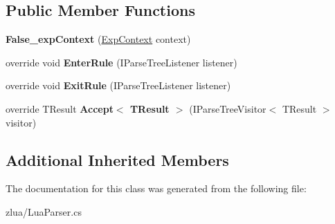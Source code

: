 \subsection*{Public Member Functions}
\begin{DoxyCompactItemize}
\item 
\mbox{\label{classzlua_1_1_lua_parser_1_1_false__exp_context_a066129971f105fe49aa323a2e0ed29c5}} 
{\bfseries False\+\_\+exp\+Context} (\mbox{\hyperlink{classzlua_1_1_lua_parser_1_1_exp_context}{Exp\+Context}} context)
\item 
\mbox{\label{classzlua_1_1_lua_parser_1_1_false__exp_context_ae0f16242c9c8b34a0d7a8915640aa41b}} 
override void {\bfseries Enter\+Rule} (I\+Parse\+Tree\+Listener listener)
\item 
\mbox{\label{classzlua_1_1_lua_parser_1_1_false__exp_context_aa3b1aaf503e07aabfa3c085f70139c86}} 
override void {\bfseries Exit\+Rule} (I\+Parse\+Tree\+Listener listener)
\item 
\mbox{\label{classzlua_1_1_lua_parser_1_1_false__exp_context_a0aac6f1b4b3e4c95f944bb1162166320}} 
override T\+Result {\bfseries Accept$<$ T\+Result $>$} (I\+Parse\+Tree\+Visitor$<$ T\+Result $>$ visitor)
\end{DoxyCompactItemize}
\subsection*{Additional Inherited Members}


The documentation for this class was generated from the following file\+:\begin{DoxyCompactItemize}
\item 
zlua/Lua\+Parser.\+cs\end{DoxyCompactItemize}
